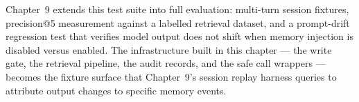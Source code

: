 Chapter~9 extends this test suite into full evaluation: multi-turn session
fixtures, precision@5 measurement against a labelled retrieval dataset, and a
prompt-drift regression test that verifies model output does not shift when
memory injection is disabled versus enabled. The infrastructure built in this
chapter --- the write gate, the retrieval pipeline, the audit records, and the
safe call wrappers --- becomes the fixture surface that Chapter~9's session
replay harness queries to attribute output changes to specific memory events.
